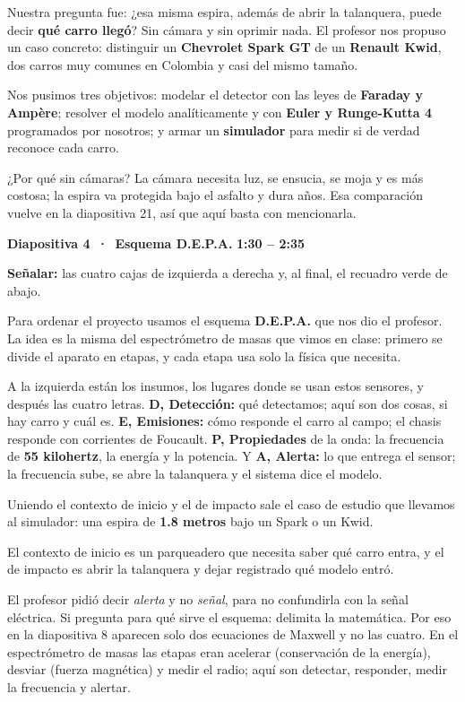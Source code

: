 \documentclass[11pt,a4paper]{article}
\newcommand{\diapo}[3]{%
  \par\vspace{8pt}
  {\large\bfseries Diapositiva #1 \,·\, #2}\hfill{\normalsize\bfseries\color{AzulIcesi} #3}\par
  \vspace{1pt}}
\newcommand{\senala}[1]{{\small\color{AzulIcesi}\textbf{Señalar:} #1}\par}
\begin{document}
Nuestra pregunta fue: ¿esa misma espira, además de abrir la talanquera, puede decir \textbf{qué carro llegó}? Sin
cámara y sin oprimir nada. El profesor nos propuso un caso concreto: distinguir un \textbf{Chevrolet Spark GT} de
un \textbf{Renault Kwid}, dos carros muy comunes en Colombia y casi del mismo tamaño.

Nos pusimos tres objetivos: modelar el detector con las leyes de \textbf{Faraday y Ampère}; resolver el modelo
analíticamente y con \textbf{Euler y Runge-Kutta 4} programados por nosotros; y armar un \textbf{simulador} para
medir si de verdad reconoce cada carro.

\begin{nota}
¿Por qué sin cámaras? La cámara necesita luz, se ensucia, se moja y es más costosa; la espira va protegida bajo el
asfalto y dura años. Esa comparación vuelve en la diapositiva 21, así que aquí basta con mencionarla.
\end{nota}

\diapo{4}{Esquema D.E.P.A.}{1:30 -- 2:35}
\senala{las cuatro cajas de izquierda a derecha y, al final, el recuadro verde de abajo.}

Para ordenar el proyecto usamos el esquema \textbf{D.E.P.A.} que nos dio el profesor. La idea es la misma del
espectrómetro de masas que vimos en clase: primero se divide el aparato en etapas, y cada etapa usa solo la física
que necesita.

A la izquierda están los insumos, los lugares donde se usan estos sensores, y después las cuatro letras.
\textbf{D, Detección:} qué detectamos; aquí son dos cosas, si hay carro y cuál es. \textbf{E, Emisiones:} cómo
responde el carro al campo; el chasis responde con corrientes de Foucault. \textbf{P, Propiedades} de la onda: la
frecuencia de \textbf{55 kilohertz}, la energía y la potencia. Y \textbf{A, Alerta:} lo que entrega el sensor; la
frecuencia sube, se abre la talanquera y el sistema dice el modelo.

Uniendo el contexto de inicio y el de impacto sale el caso de estudio que llevamos al simulador: una espira de
\textbf{1.8 metros} bajo un Spark o un Kwid.

\begin{opcional}
El contexto de inicio es un parqueadero que necesita saber qué carro entra, y el de impacto es abrir la talanquera
y dejar registrado qué modelo entró.
\end{opcional}

\begin{nota}
El profesor pidió decir \emph{alerta} y no \emph{señal}, para no confundirla con la señal eléctrica. Si pregunta
para qué sirve el esquema: delimita la matemática. Por eso en la diapositiva 8 aparecen solo dos ecuaciones de
Maxwell y no las cuatro. En el espectrómetro de masas las etapas eran acelerar (conservación de la energía),
desviar (fuerza magnética) y medir el radio; aquí son detectar, responder, medir la frecuencia y alertar.
\end{nota}
\end{document}

